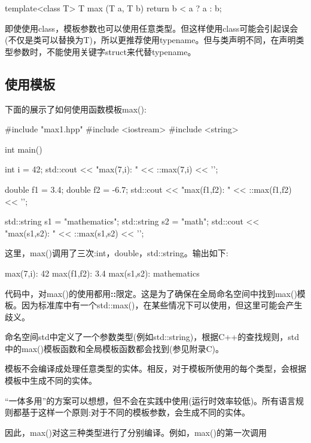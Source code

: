 \begin{cpp}
template<class T>
T max (T a, T b)
{
	return b < a ? a : b;
}
\end{cpp}

即使使用class，模板参数也可以使用任意类型。但这样使用class可能会引起误会(不仅是类可以替换为T)，所以更推荐使用typename。但与类声明不同，在声明类型参数时，不能使用关键字struct来代替typename。

\subsection{使用模板}

下面的展示了如何使用函数模板max():

\begin{cpp}
#include "max1.hpp"
#include <iostream>
#include <string>

int main()
{
	int i = 42;
	std::cout << "max(7,i): " << ::max(7,i) << '\n';
	
	double f1 = 3.4;
	double f2 = -6.7;
	std::cout << "max(f1,f2): " << ::max(f1,f2) << '\n';
	
	std::string s1 = "mathematics";
	std::string s2 = "math";
	std::cout << "max(s1,s2): " << ::max(s1,s2) << '\n';
}
\end{cpp}

这里，max()调用了三次:int，double，std::string。输出如下:

\begin{shell}
max(7,i): 42
max(f1,f2): 3.4
max(s1,s2): mathematics
\end{shell}

代码中，对max()的使用都用\textbf{::}限定。这是为了确保在全局命名空间中找到max()模板。因为标准库中有一个std::max()，在某些情况下可以使用，但这里可能会产生歧义。

\begin{notice}
命名空间std中定义了一个参数类型(例如std::string)，根据C++的查找规则，std中的max()模板函数和全局模板函数都会找到(参见附录C)。
\end{notice}

模板不会编译成处理任意类型的实体。相反，对于模板所使用的每个类型，会根据模板中生成不同的实体。

\begin{notice}
“一体多用”的方案可以想想，但不会在实践中使用(运行时效率较低)。所有语言规则都基于这样一个原则:对于不同的模板参数，会生成不同的实体。
\end{notice}

因此，max()对这三种类型进行了分别编译。例如，max()的第一次调用

